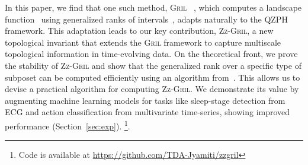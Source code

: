 \documentclass{article}
\newcommand{\gril}{\textsc{Gril}}
\newcommand{\zzgril}{\textsc{Zz-Gril}}
\theoremstyle{plain}
\theoremstyle{definition}
\theoremstyle{remark}
\begin{document}
In this paper, we find that one such method, \gril{}~\cite{gril23} , which computes a landscape function~\cite{bubenik2015perslandscapes} using generalized ranks of intervals~\cite{GenRankKim21}, adapts naturally to the QZPH framework. This adaptation leads to our key contribution, \zzgril{}, a new topological invariant that extends the \gril{} framework to capture multiscale topological information in time-evolving data. On the theoretical front, we prove the stability of \zzgril{} and show that the generalized rank over a specific type of subposet can be computed efficiently using an algorithm from~\cite{DKM24}. This allows us to devise a practical algorithm for computing \zzgril{}. We demonstrate its value by augmenting machine learning models for tasks like sleep-stage detection from ECG and action classification from multivariate time-series, showing improved performance (Section~\ref{sec:exp}). \footnote{Code is available at \url{https://github.com/TDA-Jyamiti/zzgril}}.

\end{document}
